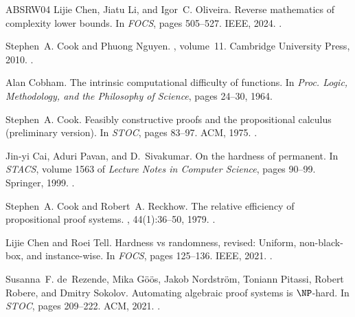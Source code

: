 \documentclass[10pt,a4paper]{article}
\theoremstyle{definition}
\theoremstyle{remark}
\begin{document}
\begin{thebibliography}{ABSRW04}
Lijie Chen, Jiatu Li, and Igor~C. Oliveira.
\newblock Reverse mathematics of complexity lower bounds.
\newblock In {\em {FOCS}}, pages 505--527. {IEEE}, 2024.
\newblock \href {https://doi.org/10.1109/FOCS61266.2024.00040}
  {}.

Stephen~A. Cook and Phuong Nguyen.
, volume~11.
\newblock Cambridge University Press, 2010.
\newblock \href {https://doi.org/10.1017/CBO9780511676277}
  {}.

Alan Cobham.
\newblock The intrinsic computational difficulty of functions.
\newblock In {\em Proc. Logic, Methodology, and the Philosophy of Science},
  pages 24--30, 1964.

Stephen~A. Cook.
\newblock Feasibly constructive proofs and the propositional calculus
  (preliminary version).
\newblock In {\em {STOC}}, pages 83--97. {ACM}, 1975.
\newblock \href {https://doi.org/10.1145/800116.803756}
  {}.

Jin{-}yi Cai, Aduri Pavan, and D.~Sivakumar.
\newblock On the hardness of permanent.
\newblock In {\em {STACS}}, volume 1563 of {\em Lecture Notes in Computer
  Science}, pages 90--99. Springer, 1999.
\newblock \href {https://doi.org/10.1007/3-540-49116-3\_8}
  {}.

Stephen~A. Cook and Robert~A. Reckhow.
\newblock The relative efficiency of propositional proof systems.
, 44(1):36--50, 1979.
\newblock \href {https://doi.org/10.2307/2273702} {}.

Lijie Chen and Roei Tell.
\newblock Hardness vs randomness, revised: Uniform, non-black-box, and
  instance-wise.
\newblock In {\em {FOCS}}, pages 125--136. {IEEE}, 2021.
\newblock \href {https://doi.org/10.1109/FOCS52979.2021.00021}
  {}.

Susanna~F. de~Rezende, Mika G{\"{o}}{\"{o}}s, Jakob Nordstr{\"{o}}m, Toniann
  Pitassi, Robert Robere, and Dmitry Sokolov.
\newblock Automating algebraic proof systems is {$\NP$}-hard.
\newblock In {\em {STOC}}, pages 209--222. {ACM}, 2021.
\newblock \href {https://doi.org/10.1145/3406325.3451080}
  {}.


\end{thebibliography}
\end{document}
